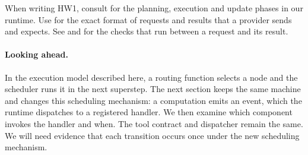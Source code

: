 When writing HW1, consult \citet{langgraph-pregel} for the planning, execution and update phases
in our runtime. Use \citet{anthropic-tooluse} for the exact format of requests and results that a
provider sends and expects. See  and  for the checks
that run between a request and its result.

\paragraph{Looking ahead.} In the execution model described here, a routing function selects a
node and the scheduler runs it in the next superstep. The next section keeps the same machine
and changes this scheduling mechanism: a computation emits an event, which the runtime dispatches
to a registered handler. We then examine which component invokes the handler and when. The tool
contract and dispatcher remain the same. We will need evidence that each transition occurs once
under the new scheduling mechanism.
